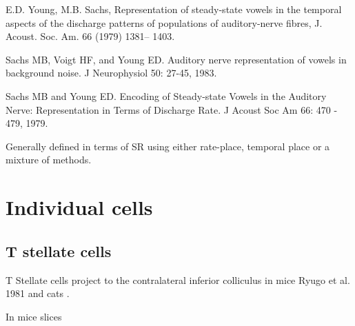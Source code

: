 \documentclass[10pt,a4paper]{article}
\begin{document}
E.D. Young, M.B. Sachs, Representation of steady-state vowels
in the temporal aspects of the discharge patterns of populations
of auditory-nerve fibres, J. Acoust. Soc. Am. 66 (1979) 1381--
1403.

Sachs MB, Voigt HF, and Young ED. Auditory nerve representation of vowels in
background noise. J Neurophysiol 50: 27-45, 1983.

Sachs MB and Young ED. Encoding of Steady-state Vowels in the Auditory Nerve:
Representation in Terms of Discharge Rate. J Acoust Soc Am 66: 470 - 479, 1979.

Generally defined in terms of SR using either rate-place, temporal place or a
mixture of methods.

\section{Individual cells}
\subsection[T stellate cells]{T stellate cells}

T Stellate cells project to the contralateral inferior colliculus in mice
\citep{OertelWuEtAl:1990,RoullierRyugo:1984} Ryugo et al. 1981 and
cats \citep{Adams:1979,Adams:1983,Cant:1982,Oliver:1987,Osen:1972,RothAitkinEtAl:1978}.

In mice slices \citep{FerragamoGoldingEtAl:1998a}
\end{document}
